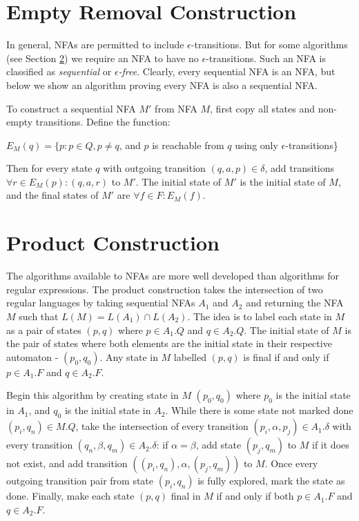 \section{Empty Removal Construction}
\label{sec:Empty Removal Construction}
In general, NFAs are permitted to include $\epsilon$-transitions. But for some algorithms (see Section \ref{sec:Product Construction}) we require an NFA to have no $\epsilon$-transitions. Such an NFA is classified as \emph{sequential} or \emph{$\epsilon$-free}. Clearly, every sequential NFA is an NFA, but below we show an algorithm proving every NFA is also a sequential NFA.

To construct a sequential NFA $M'$ from NFA $M$, first copy all states and non-empty transitions. Define the function:
\begin{center}
  $E_M(q) = \{p : p \in Q, p \ne q$, and $p$ is reachable from $q$ using only $\epsilon$-transitions\}
\end{center}
Then for every state $q$ with outgoing transition $(q, a, p) \in \delta$, add transitions $\forall r \in E_M(p): (q, a, r)$ to $M'$. The initial state of $M'$ is the initial state of $M$, and the final states of $M'$ are $\forall f \in F: E_M(f)$.





\section{Product Construction}
\label{sec:Product Construction}
The algorithms available to NFAs are more well developed than algorithms for regular expressions. The product construction takes the intersection of two regular languages by taking sequential NFAs $A_1$ and $A_2$ and returning the NFA $M$ such that $L(M) = L(A_1) \cap L(A_2)$. The idea is to label each state in $M$ as a pair of states $(p, q)$ where $p \in A_1.Q$ and $q \in A_2.Q$. The initial state of $M$ is the pair of states where both elements are the initial state in their respective automaton - $(p_0, q_0)$. Any state in $M$ labelled $(p, q)$ is final if and only if $p \in A_1.F$ and $q \in A_2.F$.

Begin this algorithm by creating state in $M$ $(p_0, q_0)$ where $p_0$ is the initial state in $A_1$, and $q_0$ is the initial state in $A_2$. While there is some state not marked done $(p_i, q_n) \in M.Q$, take the intersection of every transition $(p_i, \alpha, p_j) \in A_1.\delta$ with every transition $(q_n, \beta, q_m) \in A_2.\delta$: if $\alpha = \beta$, add state $(p_j, q_m)$ to $M$ if it does not exist, and add transition $((p_i, q_n), \alpha, (p_j, q_m))$ to $M$. Once every outgoing transition pair from state $(p_i, q_n)$ is fully explored, mark the state as done. Finally, make each state $(p, q)$ final in $M$ if and only if both $p \in A_1.F$ and $q \in A_2.F$.

